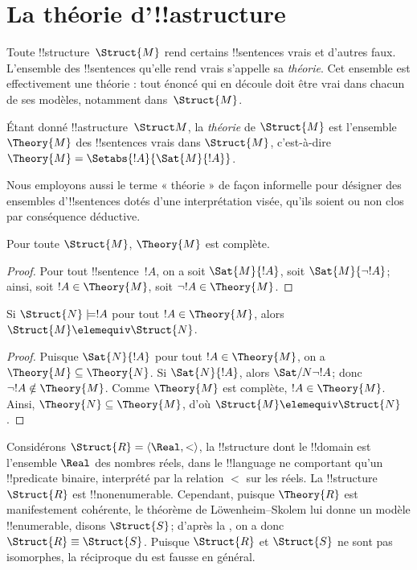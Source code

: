 \documentclass[../../../include/open-logic-section]{subfiles}
\begin{document}

\section{La théorie d'!!a{structure}}

Toute !!{structure}~$\Struct{M}$ rend certains !!{sentence}s vrais
et d'autres faux. L'ensemble des !!{sentence}s qu'elle rend vrais
s'appelle sa \emph{théorie}. Cet ensemble est effectivement une
théorie : tout énoncé qui en découle doit être vrai dans chacun de
ses modèles, notamment dans~$\Struct{M}$.

\begin{defn}
  Étant donné !!a{structure}~$\Struct M$, la \emph{théorie}
  de $\Struct{M}$ est
  l'ensemble $\Theory{M}$ des !!{sentence}s vrais dans $\Struct{M}$,
  c'est-à-dire $\Theory{M} = \Setabs{!A}{\Sat{M}{!A}}$.
\end{defn}

Nous employons aussi le terme « théorie » de façon informelle pour
désigner des ensembles d'!!{sentence}s dotés d'une interprétation
visée, qu'ils soient ou non clos par conséquence déductive.

\begin{prop}
Pour toute $\Struct{M}$, $\Theory{M}$ est complète.
\end{prop}

\begin{proof}
Pour tout !!{sentence}~$!A$, on a soit $\Sat{M}{!A}$, soit
$\Sat{M}{\lnot !A}$; ainsi, soit $!A \in \Theory{M}$,
soit $\lnot !A \in \Theory{M}$.
\end{proof}

\begin{prop}
  Si $\Struct{N} \models !A$ pour tout $!A \in \Theory{M}$,
  alors $\Struct{M} \elemequiv \Struct{N}$.
\end{prop}

\begin{proof}
Puisque $\Sat{N}{!A}$ pour tout $!A \in \Theory{M}$, on a
$\Theory{M} \subseteq \Theory{N}$. Si $\Sat{N}{!A}$, alors
$\Sat/{N}{\lnot !A}$; donc $\lnot !A \notin \Theory{M}$.
Comme $\Theory{M}$ est complète, $!A \in \Theory{M}$.
Ainsi, $\Theory{N} \subseteq \Theory{M}$, d'où
$\Struct{M} \elemequiv \Struct{N}$.
\end{proof}

\begin{rem}
  Considérons $\Struct{R} = \langle\Real, <\rangle$, la !!{structure}
  dont le !!{domain} est l'ensemble $\Real$ des nombres réels, dans
  le !!{language} ne comportant qu'un !!{predicate} binaire,
  interprété par la relation $<$ sur les réels. La !!{structure}
  $\Struct{R}$ est !!{nonenumerable}. Cependant, puisque
  $\Theory{R}$ est manifestement cohérente, le théorème de
  L\"owenheim--Skolem lui donne un modèle !!{enumerable},
  disons $\Struct{S}$; d'après la , on a donc
  $\Struct{R} \equiv \Struct{S}$. Puisque $\Struct{R}$ et
  $\Struct{S}$ ne sont pas isomorphes, la réciproque du
   est fausse en général.
\end{rem}
\end{document}
